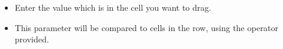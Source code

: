
\begin{itemize}
\item Enter the value which is in the cell you want to drag.
\item This parameter will be compared to cells in the row, using the operator provided.
\end{itemize}
